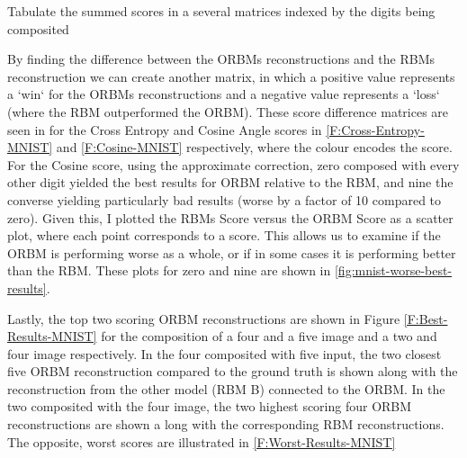   \begin{algorithm}[!ht]

    {
     Tabulate the summed scores in a several matrices indexed by the digits being composited\;
   }
  \caption{The algorithm explaining how the scores matrices were computed.}\label{alg:scores}
  \end{algorithm}

  By finding the difference between the ORBMs reconstructions and the RBMs reconstruction we can create another matrix, in which a positive value represents a `win` for the ORBMs reconstructions and a negative value represents a `loss` (where the RBM outperformed the ORBM). These score difference matrices are seen in for the Cross Entropy and Cosine Angle scores in \ref{F:Cross-Entropy-MNIST} and \ref{F:Cosine-MNIST} respectively, where the colour encodes the score. For the Cosine score,  using the approximate correction, zero composed with every other digit yielded the best results for ORBM relative to the RBM, and nine the converse yielding particularly bad results (worse by a factor of 10 compared to zero). Given this, I plotted the RBMs Score versus the ORBM Score as a scatter plot, where each point corresponds to a score. This allows us to examine if the ORBM is performing worse as a whole, or if in some cases it is performing better than the RBM. These plots for zero and nine are shown in \ref{fig:mnist-worse-best-results}.

  Lastly, the top two scoring ORBM reconstructions are shown in Figure \ref{F:Best-Results-MNIST} for the composition of a four and a five image and a two and four image respectively. In the four composited with five input, the two closest five ORBM reconstruction compared to the ground truth is shown along with the reconstruction from the other model (RBM B) connected to the ORBM.
  In the two composited with the four image, the two highest scoring four ORBM reconstructions are shown a long with the corresponding RBM reconstructions.
  The opposite, worst scores are illustrated in \ref{F:Worst-Results-MNIST}

